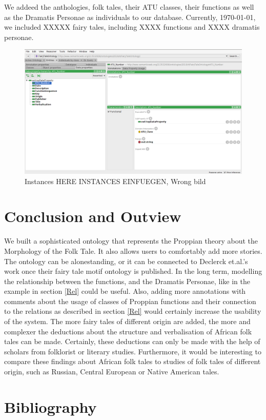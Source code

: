 \documentclass[10pt,a4paper]{article}
\begin{document}
We addeed the anthologies, folk tales, their ATU classes, their functions as well as the Dramatis Personae as individuals to our database. Currently, \today , we included XXXXX fairy tales, including XXXX functions and XXXX dramatis personae.
\begin{figure}[H]
\centering
 	\includegraphics[scale=0.25]{Screen5.png}
 	\caption{Instances HERE INSTANCES EINFUEGEN, Wrong bild}
\end{figure}
\newpage



\section{Conclusion and Outview}
We built a sophisticated ontology that represents the Proppian theory about the Morphology of the Folk Tale.\cite{propp1968} It also allows users to comfortably add more stories. The ontology can be alonestanding, or it can be connected to Declerck et.al.'s \cite{Declerck2017} work once their fairy tale motif ontology is published. In the long term, modelling the relationship between the functions, and the Dramatis Personae, like in the example in section \ref{Rel} could be useful. Also, adding more annotations with comments about the usage of classes of Proppian functions and their connection to the relations as described in section \ref{Rel} would certainly increase the usability of the system.
 The more fairy tales of different origin are added, the more and complexer the deductions about the structure and verbalisation of African folk tales can be made. Certainly, these deductions can only be made with the help of scholars from folklorist or literary studies. Furthermore, it would be interesting to compare these findings about African folk tales to studies of folk tales of different origin, such as Russian, Central European or Native American tales. 
\newpage
    
\section{Bibliography}

 

\end{document}
